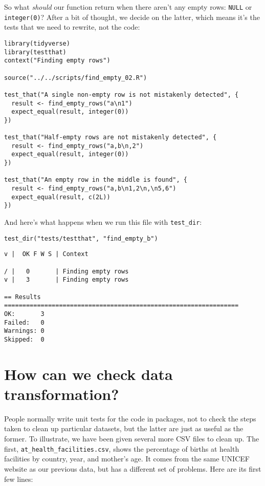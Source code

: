 So what \emph{should} our function return when there aren't any empty rows: \texttt{NULL} or \texttt{integer(0)}?
After a bit of thought,
we decide on the latter,
which means it's the tests that we need to rewrite,
not the code:

\begin{lstlisting}
library(tidyverse)
library(testthat)
context("Finding empty rows")

source("../../scripts/find_empty_02.R")

test_that("A single non-empty row is not mistakenly detected", {
  result <- find_empty_rows("a\n1")
  expect_equal(result, integer(0))
})

test_that("Half-empty rows are not mistakenly detected", {
  result <- find_empty_rows("a,b\n,2")
  expect_equal(result, integer(0))
})

test_that("An empty row in the middle is found", {
  result <- find_empty_rows("a,b\n1,2\n,\n5,6")
  expect_equal(result, c(2L))
})
\end{lstlisting}

And here's what happens when we run this file with \texttt{test\_dir}:

\begin{lstlisting}
test_dir("tests/testthat", "find_empty_b")
\end{lstlisting}

\begin{lstlisting}
v |  OK F W S | Context

/ |   0       | Finding empty rows
v |   3       | Finding empty rows

== Results ================================================================
OK:       3
Failed:   0
Warnings: 0
Skipped:  0
\end{lstlisting}

\section{How can we check data transformation?}

People normally write unit tests for the code in packages,
not to check the steps taken to clean up particular datasets,
but the latter are just as useful as the former.
To illustrate,
we have been given several more CSV files to clean up.
The first,
\texttt{at\_health\_facilities.csv},
shows the percentage of births at health facilities by country, year, and mother's age.
It comes from the same UNICEF website as our previous data,
but has a different set of problems.
Here are its first few lines:

